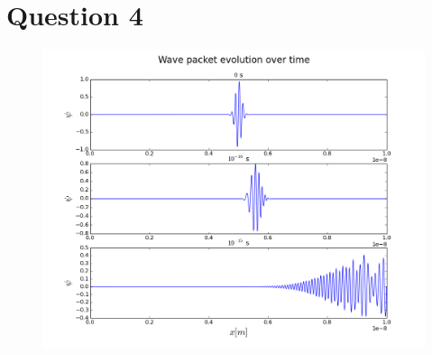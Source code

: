 \documentclass[a4paper,12pt]{article}
\begin{document}
\section{Question 4}

\begin{figure}[H]
\centering
\includegraphics[width = \linewidth]{lab9q4.png}
\caption{}
\label{fig:q4}
\end{figure}
\end{document}
